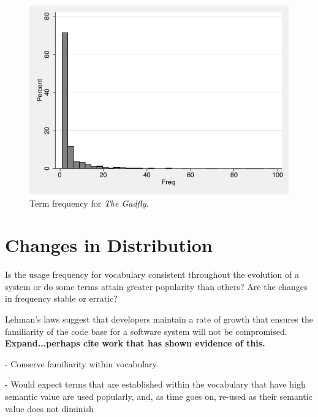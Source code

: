 
\begin{figure}[t]
\centering
\includegraphics[width=\textwidth]{Figures/Vocab-BookFreqDist.pdf}
\caption{Term frequency for \emph{The Gadfly}.}
\label{fig:vocab-freqage-hibernate}
\end{figure}



\section{Changes in Distribution} %
\label{sec:changes_in_distribution}

Is the usage frequency for vocabulary consistent throughout the evolution of a system or do some terms attain greater popularity than others? Are the changes in frequency stable or erratic?

Lehman's laws suggest that developers maintain a rate of growth that ensures the familiarity of the code base for a software system will not be compromised. \textbf{Expand...perhaps cite work that has shown evidence of this.}

\crumbs
{
- Conserve familiarity within vocabulary

- Would expect terms that are established within the vocabulary that have high semantic value are used popularly, and, as time goes on, re-used as their semantic value does not diminish

}

